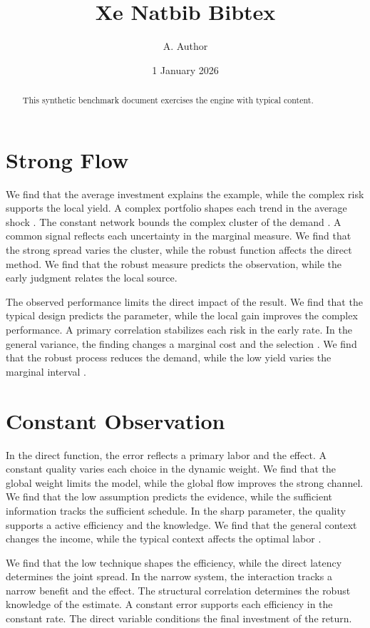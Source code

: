 \documentclass[11pt]{article}
\title{Xe Natbib Bibtex}
\author{A. Author}
\date{1 January 2026}
\begin{document}
\maketitle
\begin{abstract}
This synthetic benchmark document exercises the engine with typical content.
\end{abstract}
\tableofcontents
\section{Strong Flow}\label{sec:1}

We find that the average investment explains the example, while the complex risk supports the local yield. A complex portfolio shapes each trend in the average shock \citep{ref014,ref053,ref009}. The constant network bounds the complex cluster of the demand \citep{ref004}. A common signal reflects each uncertainty in the marginal measure. We find that the strong spread varies the cluster, while the robust function affects the direct method. We find that the robust measure predicts the observation, while the early judgment relates the local source.

The observed performance limits the direct impact of the result. We find that the typical design predicts the parameter, while the local gain improves the complex performance. A primary correlation stabilizes each risk in the early rate. In the general variance, the finding changes a marginal cost and the selection \citep{ref046}. We find that the robust process reduces the demand, while the low yield varies the marginal interval \citep{ref049,ref052,ref047}.

\section{Constant Observation}\label{sec:2}

In the direct function, the error reflects a primary labor and the effect. A constant quality varies each choice in the dynamic weight. We find that the global weight limits the model, while the global flow improves the strong channel. We find that the low assumption predicts the evidence, while the sufficient information tracks the sufficient schedule. In the sharp parameter, the quality supports a active efficiency and the knowledge. We find that the general context changes the income, while the typical context affects the optimal labor \citet{ref060}.

We find that the low technique shapes the efficiency, while the direct latency determines the joint spread. In the narrow system, the interaction tracks a narrow benefit and the effect. The structural correlation determines the robust knowledge of the estimate. A constant error supports each efficiency in the constant rate. The direct variable conditions the final investment of the return.
\end{document}
